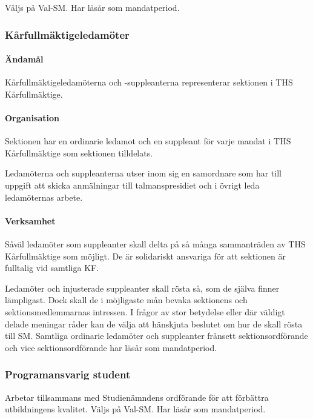 \documentclass{dgovdoc}
\begin{document}
Väljs på Val-SM. Har läsår som mandatperiod.

\subsubsection{Kårfullmäktigeledamöter}

\paragraph{Ändamål}

Kårfullmäktigeledamöterna och -suppleanterna representerar sektionen i THS
Kårfullmäktige.

\paragraph{Organisation}

Sektionen har en ordinarie ledamot och en suppleant för varje mandat i THS
Kårfullmäktige som sektionen tilldelats.

Ledamöterna och suppleanterna utser inom sig en samordnare som har till uppgift
att skicka anmälningar till talmanspresidiet och i övrigt leda ledamöternas
arbete.

\paragraph{Verksamhet}

Såväl ledamöter som suppleanter skall delta på så många sammanträden av THS
Kårfullmäktige som möjligt. De är solidariskt ansvariga för att sektionen är
fulltalig vid samtliga KF.

Ledamöter och injusterade suppleanter skall rösta så, som de själva finner
lämpligast. Dock skall de i möjligaste mån bevaka sektionens och
sektionsmedlemmarnas intressen. I frågor av stor betydelse eller där väldigt
delade meningar råder kan de välja att hänskjuta beslutet om hur de skall rösta
till SM. Samtliga ordinarie ledamöter och suppleanter frånsett
sektionsordförande och vice sektionsordförande har läsår som mandatperiod.

\subsubsection{Programansvarig student}

Arbetar tillsammans med Studienämndens ordförande för att förbättra
utbildningens kvalitet. Väljs på Val-SM. Har läsår som mandatperiod.
\end{document}
